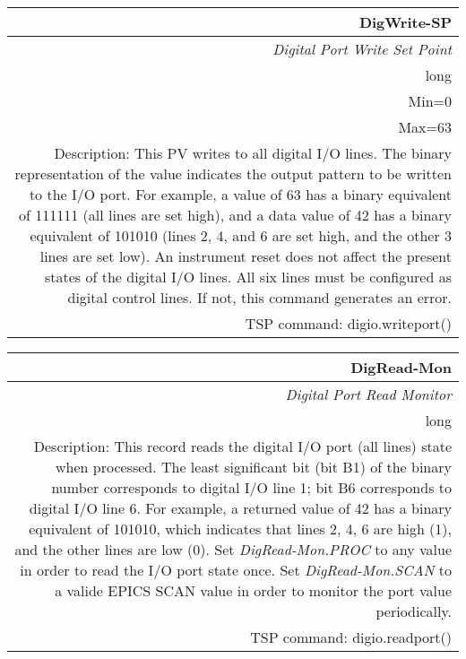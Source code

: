 \documentclass[openany]{article}
\begin{document}
		\begin{tabular}{N}
			\hline
			\bfseries DigWrite-SP\label{pv:digwrite-sp} \\ \hline
			\emph{Digital Port Write Set Point} \\
			long \\
			Min=0 \\ 
			Max=63 \\
			Description: This PV writes to all digital I/O lines. The binary representation of the value indicates the output pattern to be written to the I/O port. For example, a value of 63 has a binary equivalent of 111111 (all lines are set high), and a data value of 42 has a binary equivalent of 101010 (lines 2, 4, and 6 are set high, and the other 3 lines are set low). An instrument reset does not affect the present states of the digital I/O lines. All six lines must be configured as digital control lines. If not, this command generates an error. \\
			TSP command: digio.writeport()
		\end{tabular}

		\begin{tabular}{N}
			\hline
			\bfseries DigRead-Mon\label{pv:digread-mon} \\ \hline
			\emph{Digital Port Read Monitor} \\
			long \\
			Description: This record reads the digital I/O port (all lines) state when processed. The least significant bit (bit B1) of the binary number corresponds to digital I/O line 1; bit B6 corresponds to digital I/O line 6. For example, a returned value of 42 has a binary equivalent of 101010, which indicates that lines 2, 4, 6 are high (1), and the other lines are low (0). Set \emph{DigRead-Mon.PROC} to any value in order to read the I/O port state once. Set \emph{DigRead-Mon.SCAN} to a valide EPICS SCAN value in order to monitor the port value periodically. \\
			TSP command: digio.readport()
		\end{tabular}
\end{document}
